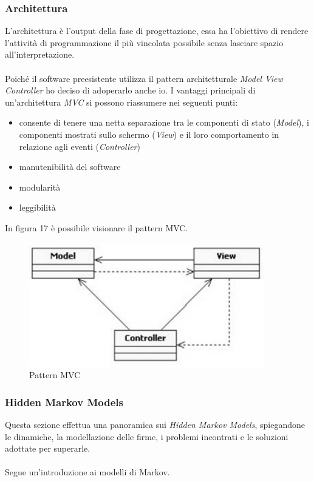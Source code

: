 \subsubsection{Architettura}
\label{3.3.1}
L'architettura è l'output della fase di progettazione, essa ha l'obiettivo di rendere l'attività di programmazione il più vincolata possibile senza lasciare spazio all'interpretazione.\\\\
Poiché il software preesistente utilizza il pattern architetturale \emph{Model View Controller} ho deciso di adoperarlo anche io. I vantaggi principali di un'architettura \emph{MVC} si possono riassumere nei seguenti punti:
\begin{itemize}
\item consente di tenere una netta separazione tra le componenti di stato (\emph{Model}), i componenti mostrati sullo schermo (\emph{View}) e
il loro comportamento in relazione agli eventi (\emph{Controller})
\item manutenibilità del software
\item modularità
\item leggibilità
\end{itemize}
In figura 17 è possibile visionare il pattern MVC.
\begin{figure}[H]
\centering
\includegraphics[scale=0.7]{../capitolo3img/mvc.png}
\caption{Pattern MVC}
\end{figure}
\subsubsection{Hidden Markov Models}
\label{3.3.2}
Questa sezione effettua una panoramica sui \emph{Hidden Markov Models}, spiegandone le dinamiche, la modellazione delle firme, i problemi incontrati e le soluzioni adottate per superarle.\\\\
Segue un'introduzione ai modelli di Markov.
